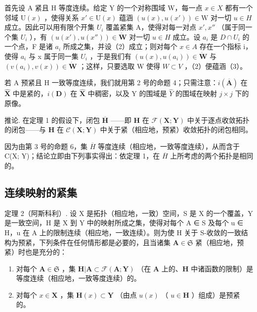 首先设 A 紧且 H 等度连续。给定 Y 的一个对称围域 W，每一点 \(x \in X\) 都有一个邻域 \(\mathrm{U}(x)\) ，使得关系 \(x' \in \mathrm{U}(x)\) 蕴涵 \((u(x), u(x')) \in \mathrm{W}\) 对一切 \(u \in H\) 成立。因此可以用有限个开集 \(U_i\) 覆盖紧集 A，使得对每一对点 \(x', x''\) （属于同一个集 \(U_i\) ），有 \((u(x'), u(x'')) \in \dot{\mathbf{W}}\) 对一切 \(u \in H\) 成立。设 \(a_i\) 是 \(D \cap U_i\) 的一个点，F 是诸 \(a_i\) 所成之集，并设（2）成立；则对每个 \(x \in A\) 存在一个指标 i，使得 \(a_i\) 与 x 属于同一集 \(U_i\) ，于是我们有 \((u(x), u(a_i)) \in \dot{\mathbf{W}}\) 与 \((v(a_i), v(x)) \in \dot{\mathbf{W}}\) ；这样，只要选取 W 使得 \(W \subset V\) ，（2）便蕴涵（3）。

若 A 预紧且 H 一致等度连续，我们就用第 2 号的命题 4；只需注意：\(i(\overline{\mathbf{A}})\) 在 \(\hat{\mathbf{X}}\) 中是紧的，\(i(\mathbf{D})\) 在 \(\hat{\mathbf{X}}\) 中稠密，以及 Y 的围域是 \(\hat{Y}\) 的围域在映射 \(j \times j\) 下的原像。

推论. 在定理 1 的假设下，闭包 \(\overline{\mathbf{H}}\) ——即 \(\mathbf{H}\) 在 \(\mathcal{F}(\mathbf{X};\mathbf{Y})\) 中关于逐点收敛拓扑的闭包——与 \(\mathbf{H}\) 在 \(\mathcal{C}(\mathbf{X};\mathbf{Y})\) 中关于紧（相应地，预紧）收敛拓扑的闭包相同。

因为由第 3 号的命题 6，集 \(\overline{H}\) 等度连续（相应地，一致等度连续），从而含于 C(X; Y)；结论立即由下列事实得出：依定理 1，在 \(\overline{H}\) 上所考虑的两个拓扑是相同的。

\subsection{连续映射的紧集}

定理 2（阿斯科利）. 设 X 是拓扑（相应地，一致）空间，S 是 X 的一个覆盖，Y 是一致空间，H 是 X 到 Y 中的映射所成之集，使得对每个 A ∈ S 及每个 u ∈ H，u 在 A 上的限制连续（相应地，一致连续）。则为使 H 关于 S-收敛的一致结构为预紧，下列条件在任何情形都是必要的，且当诸集 \(\mathbf{A} \in \mathfrak{S}\) 紧（相应地，预紧）时也是充分的：

\begin{enumerate}
\def\labelenumi{\alph{enumi})}
\item
  对每个 \(\mathbf{A} \in \mathfrak{S}\) ，集 \(\mathbf{H}|\mathbf{A} \subset \mathcal{F}(\mathbf{A};\mathbf{Y})\) （在 \(\mathbf{A}\) 上的、\(\mathbf{H}\) 中诸函数的限制）是等度连续（相应地，一致等度连续）的。
\item
  对每个 \(x \in \mathbf{X}\) ，集 \(\mathbf{H}(x) \subset \mathbf{Y}\) （由点 \(u(x)\) （ \(u \in \mathbf{H}\) ）组成）是预紧的。
\end{enumerate}

